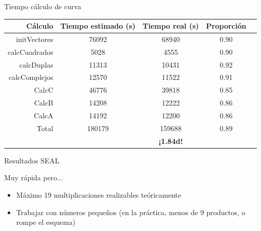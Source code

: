 \documentclass{beamer}
\begin{document}
\begin{frame}{Tiempo cálculo de curva}
    \begin{table}[]
        \centering
        \begin{tabular}{r | c c c c}
            Cálculo & Tiempo estimado (s) & Tiempo real (s) & Proporción \\
            \hline \hline
            initVectores  & 76092 & 68940  & 0.90 \\
            calcCuadrados & 5028  & 4555 & 0.90 \\
            calcDuplas  & 11313 & 10431 & 0.92 \\
            calcComplejos & 12570 & 11522 & 0.91 \\
            CalcC & 46776 & 39818  & 0.85 \\
            CalcB & 14208 & 12222  & 0.86 \\
            CalcA & 14192 & 12200  & 0.86 \\
            Total & 180179  & 159688 & 0.89 \\
            \hline
            &  & \textbf{¡1.84d!} & \\
        \end{tabular}
    \end{table}
\end{frame}

\begin{frame}{Resultados SEAL}

    \begin{alertblock}{Muy rápida pero...}
        \begin{itemize}
            \item Máximo 19 multiplicaciones realizables teóricamente
            \item Trabajar con números pequeños (en la práctica, menos de 9 productos, o rompe el esquema)
        \end{itemize}
    \end{alertblock}

\end{frame}
\end{document}
